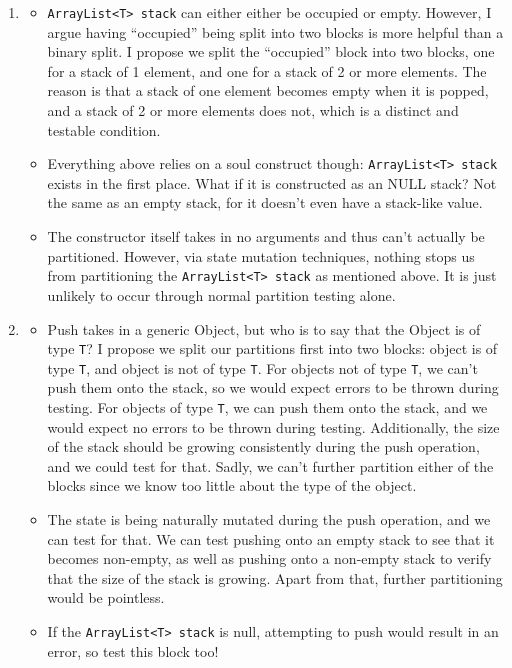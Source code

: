 \documentclass{article}
\newcommand{\Stack}{\texttt{ArrayList<T> stack} }
\begin{document}
\begin{enumerate}
    \item
    \begin{itemize}
        \item \Stack can either either be occupied or empty. However, I argue having ``occupied'' being split into two blocks is more helpful than a binary split. I propose we split the ``occupied'' block into two blocks, one for a stack of 1 element, and one for a stack of 2 or more elements. The reason is that a stack of one element becomes empty when it is popped, and a stack of 2 or more elements does not, which is a distinct and testable condition.
        \item Everything above relies on a soul construct though: \Stack exists in the first place. What if it is constructed as an NULL stack? Not the same as an empty stack, for it doesn't even have a stack-like value.
        \item The constructor itself takes in no arguments and thus can't actually be partitioned. However, via state mutation techniques, nothing stops us from partitioning the \Stack as mentioned above. It is just unlikely to occur through normal partition testing alone.
    \end{itemize}
    \item
    \begin{itemize}
        \item Push takes in a generic Object, but who is to say that the Object is of type \texttt{T}? I propose we split our partitions first into two blocks: object is of type \texttt{T}, and object is not of type \texttt{T}. For objects not of type \texttt{T}, we can't push them onto the stack, so we would expect errors to be thrown during testing. For objects of type \texttt{T}, we can push them onto the stack, and we would expect no errors to be thrown during testing. Additionally, the size of the stack should be growing consistently during the push operation, and we could test for that. Sadly, we can't further partition either of the blocks since we know too little about the type of the object.
        \item The state is being naturally mutated during the push operation, and we can test for that. We can test pushing onto an empty stack to see that it becomes non-empty, as well as pushing onto a non-empty stack to verify that the size of the stack is growing. Apart from that, further partitioning would be pointless.
        \item If the \Stack is null, attempting to push would result in an error, so test this block too!

\end{itemize}
\end{enumerate}
\end{document}
